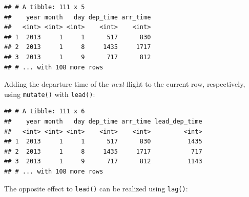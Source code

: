 \documentclass[]{book}
\newenvironment{Shaded}{}{}
\newcommand{\DataTypeTok}[1]{#1}
\newcommand{\KeywordTok}[1]{\textcolor[rgb]{0.00,0.00,1.00}{#1}}
\newcommand{\NormalTok}[1]{#1}
\newcommand{\OperatorTok}[1]{#1}
\newcommand{\StringTok}[1]{\textcolor[rgb]{0.00,0.50,0.50}{#1}}
\begin{document}
\begin{verbatim}
## # A tibble: 111 x 5
##    year month   day dep_time arr_time
##   <int> <int> <int>    <int>    <int>
## 1  2013     1     1      517      830
## 2  2013     1     8     1435     1717
## 3  2013     1     9      717      812
## # ... with 108 more rows
\end{verbatim}

Adding the departure time of the \emph{next} flight to the current row, respectively, using \texttt{mutate()} with \texttt{lead()}:

\begin{Shaded}
\end{Shaded}

\begin{verbatim}
## # A tibble: 111 x 6
##    year month   day dep_time arr_time lead_dep_time
##   <int> <int> <int>    <int>    <int>         <int>
## 1  2013     1     1      517      830          1435
## 2  2013     1     8     1435     1717           717
## 3  2013     1     9      717      812          1143
## # ... with 108 more rows
\end{verbatim}

The opposite effect to \texttt{lead()} can be realized using \texttt{lag()}:

\begin{Shaded}
\end{Shaded}
\end{document}
